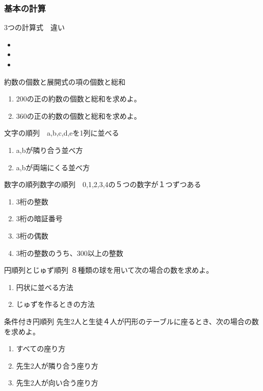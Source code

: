 \documentclass[10pt,dvipdfmx]{jsarticle}
\begin{document}
\subsubsection*{基本の計算}
\begin{itembox}[l]{3つの計算式　違い}
  \begin{multicols}{3}
    \begin{itemize}
      \item \item \item
    \end{itemize}
  \end{multicols}
\end{itembox}

\begin{itembox}[l]{約数の個数と展開式の項の個数と総和}
  \begin{enumerate}
    \item 200の正の約数の個数と総和を求めよ。
    \item 360の正の約数の個数と総和を求めよ。
  \end{enumerate}
\end{itembox}
\begin{itembox}[l]{文字の順列　a,b,c,d,eを1列に並べる}
  \begin{enumerate}
    \item a,bが隣り合う並べ方
    \item a,bが両端にくる並べ方
  \end{enumerate}
\end{itembox}
\begin{itembox}[l]{数字の順列数字の順列　0,1,2,3,4の５つの数字が１つずつある}
  \begin{enumerate}
    \item 3桁の整数
    \item 3桁の暗証番号
    \item 3桁の偶数
    \item 3桁の整数のうち、300以上の整数
  \end{enumerate}
\end{itembox}
\begin{itembox}[l]{円順列とじゅず順列}
  ８種類の球を用いて次の場合の数を求めよ。
  \begin{enumerate}
    \item 円状に並べる方法
    \item じゅずを作るときの方法
  \end{enumerate}
\end{itembox}
\begin{itembox}[l]{条件付き円順列}
  先生2人と生徒４人が円形のテーブルに座るとき、次の場合の数を求めよ。
  \begin{enumerate}
    \item すべての座り方
    \item 先生2人が隣り合う座り方
    \item 先生2人が向い合う座り方
  \end{enumerate}
\end{itembox}
\end{document}
